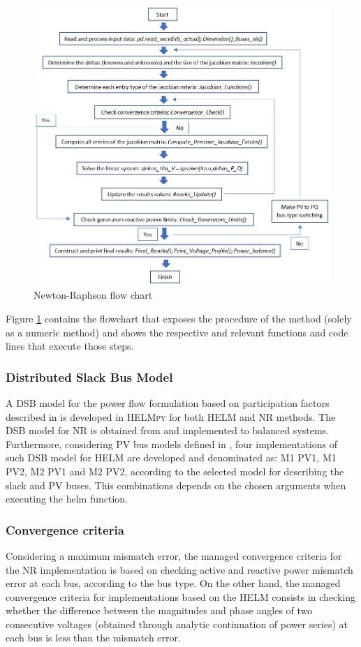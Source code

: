 \documentclass[12pt]{article}
\begin{document}
\begin{figure}[!h]
	\centering
	\includegraphics[width=\textwidth]{nrflowchart}
	\caption{Newton-Raphson flow chart}
	\label{nrflowchart}
\end{figure}

Figure \ref{nrflowchart}  contains the flowchart that exposes the procedure of the method (solely as a numeric method) and shows the respective and relevant functions and code lines that execute those steps.

\subsubsection{Distributed Slack Bus Model}
A DSB model for the power flow formulation based on participation factors described in \cite{meisel1993system} is developed in \textsc{HELMpy} for both HELM and NR methods. The DSB model for NR is obtained from \cite{tong2005network} and implemented to balanced systems. Furthermore, considering PV bus models defined in \cite{subramanian2014application}, four implementations of such DSB model for HELM are developed and denominated as: M1 PV1, M1 PV2, M2 PV1 and M2 PV2, according to the selected model for describing the slack and PV buses. This combinations depends on the chosen arguments when executing the helm function.

\subsubsection{Convergence criteria}
Considering a maximum mismatch error, the managed convergence criteria for the NR implementation is based on checking active and reactive power mismatch error at each bus, according to the bus type. On the other hand, the managed convergence criteria for implementations based on the HELM consists in checking whether the difference between the magnitudes and phase angles of two consecutive voltages (obtained through analytic continuation of power series) at each bus is less than the mismatch error.
\end{document}

